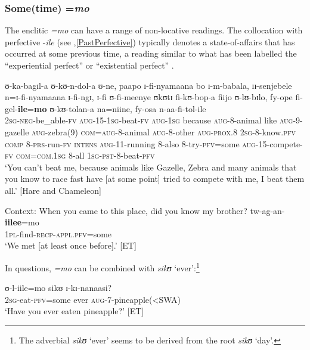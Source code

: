 \subsubsection{Some(time) =\textit{mo}}\label{MoSome}
 The enclitic \textit{=mo} can have a range of non-locative readings. The collocation with perfective \mbox{-\textit{ile}} (see ,\ref{PastPerfective}) typically denotes a state-of-affairs that has occurred at some previous time, a reading similar to what has been labelled the ``experiential perfect'' \citep{ComrieB1976} or ``existential perfect'' \citep{McCawleyJ1971}.
\begin{exe}
	\ex \label{exIleMoText}
	\gll ʊ-ka-bagɪl-a ʊ-kʊ-n-dol-a ʊ-ne, paapo ɪ-fi-nyamaana bo ɪ-m-babala, ɪɪ-senjebele n=ɪ-fi-nyamaana ɪ-fi-ngɪ, ɪ-fi ʊ-fi-meenye ʊkʊtɪ fi-kʊ-bop-a fiijo ʊ-lʊ-bɪlo, fy-ope fi-gel-\textbf{ile}=\textbf{mo} ʊ-kʊ-tolan-a na=niine, fy-osa n-aa-fi-tol-ile\\
	\textsc{2sg}-\textsc{neg}-be\_able-\textsc{fv} \textsc{aug}-15-\textsc{1sg}-beat-\textsc{fv} \textsc{aug}-\textsc{1sg} because \textsc{aug}-8-animal like \textsc{aug}-9-gazelle \textsc{aug}-zebra(9) \textsc{com}=\textsc{aug}-8-animal \textsc{aug}-8-other \textsc{aug}-\textsc{prox.8} \textsc{2sg}-8-know.\textsc{pfv} \textsc{comp} 8-\textsc{prs}-run-\textsc{fv} \textsc{intens} \textsc{aug}-11-running 8-also 8-try-\textsc{pfv}=some \textsc{aug}-15-compete-\textsc{fv} \textsc{com}=\textsc{com.1sg} 8-all \textsc{1sg}-\textsc{pst}-8-beat-\textsc{pfv}\\
	\glt `You can't beat me, because animals like Gazelle, Zebra and many animals that you know to race fast have [at some point] tried to compete with me, I beat them all.' [Hare and Chameleon]

	\ex\label{exIleMoQuestionnaire}
	Context: When you came to this place, did you know my brother?
	\gll tw-ag-an-\textbf{iile}\textbf{e}=mo\\
	\textsc{1pl}-find-\textsc{recp}-\textsc{appl.pfv}=some\\
	\glt `We met [at least once before].' [ET]
\end{exe}

In questions, \textit{=mo} can be combined with \textit{sikʊ} `ever':\footnote{The adverbial \textit{sikʊ} `ever' seems to be derived from the root \textit{sikʊ} `day'.}
\begin{exe}
	\ex \gll ʊ-l-iile=mo sikʊ ɪ-kɪ-nanaasi?\\
	\textsc{2sg}-eat-\textsc{pfv}=some ever \textsc{aug}-7-pineapple(<SWA)\\
	\glt `Have you ever eaten pineapple?' [ET]
\end{exe}

